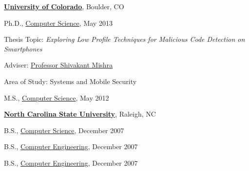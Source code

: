 \documentclass[10pt]{article}
\begin{document}
\href{http://www.colorado.edu/}{\textbf{University of Colorado}},
Boulder, CO
\begin{outerlist}

\item[] Ph.D.,
        \href{http://www.colorado.edu/cs/}
             {Computer Science},
             May 2013
        \begin{innerlist}
        \item Thesis Topic: \emph{Exploring Low Profile Techniques for Malicious Code Detection on Smartphones}
        \item Adviser:
              \href{https://www.colorado.edu/cs/users/mishras}
                   {Professor Shivakant Mishra}
        \item Area of Study: Systems and Mobile Security
        \end{innerlist}

\item[] M.S.,
        \href{http://www.colorado.edu/cs/}
             {Computer Science}, May 2012

\end{outerlist}

\href{http://www.ncsu.edu/}{\textbf{North Carolina State University}},
Raleigh, NC
\begin{outerlist}

\item[] B.S.,
        \href{https://www.csc.ncsu.edu/}
             {Computer Science}, December 2007
\item[] B.S.,
        \href{https://www.ece.ncsu.edu/}
             {Computer Engineering}, December 2007             
\item[] B.S.,
        \href{https://www.ece.ncsu.edu/}
             {Computer Engineering}, December 2007
\end{outerlist}



%
%
%
%
\end{document}
